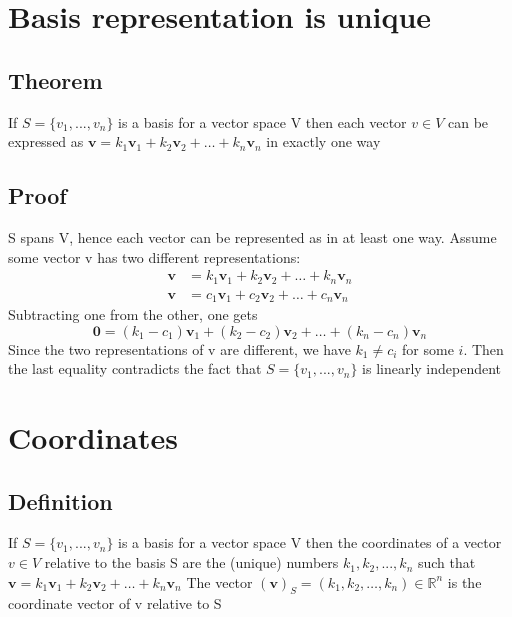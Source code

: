 \documentclass{article}[18pt]
\begin{document}
\section{Basis representation is unique}
\subsection{Theorem}
If $S=\{v_1,...,v_n\}$ is a basis for a vector space V then each vector $v\in V$ can be expressed as $\mathbf { v } = k _ { 1 } \mathbf { v } _ { 1 } + k _ { 2 } \mathbf { v } _ { 2 } + \ldots + k _ { n } \mathbf { v } _ { n }$ in exactly one way
\subsection{Proof}
S spans V, hence each vector can be represented as in at least one way. Assume some vector v has two different representations:
$$\begin{aligned} \mathbf { v } & = k _ { 1 } \mathbf { v } _ { 1 } + k _ { 2 } \mathbf { v } _ { 2 } + \ldots + k _ { n } \mathbf { v } _ { n } \\ \mathbf { v } & = c _ { 1 } \mathbf { v } _ { 1 } + c _ { 2 } \mathbf { v } _ { 2 } + \ldots + c _ { n } \mathbf { v } _ { n } \end{aligned}$$
Subtracting one from the other, one gets
$$\mathbf { 0 } = \left( k _ { 1 } - c _ { 1 } \right) \mathbf { v } _ { 1 } + \left( k _ { 2 } - c _ { 2 } \right) \mathbf { v } _ { 2 } + \ldots + \left( k _ { n } - c _ { n } \right) \mathbf { v } _ { n }$$
Since the two representations of v are different, we have $k_1\neq c_i$ for some $i$. Then the last equality contradicts the fact that $S=\{v_1,...,v_n\}$ is linearly independent
\section{Coordinates}
\subsection{Definition}
If $S=\{v_1,...,v_n\}$ is a basis for a vector space V then the coordinates of a vector $v\in V$ relative to the basis S are the (unique) numbers $k_1,k_2,...,k_n$ such that $\mathbf { v } = k _ { 1 } \mathbf { v } _ { 1 } + k _ { 2 } \mathbf { v } _ { 2 } + \ldots + k _ { n } \mathbf { v } _ { n }$
The vector $( \mathbf { v } ) _ { S } = \left( k _ { 1 } , k _ { 2 } , \dots , k _ { n } \right) \in \mathbb { R } ^ { n }$ is the coordinate vector of v relative to S
\end{document}
